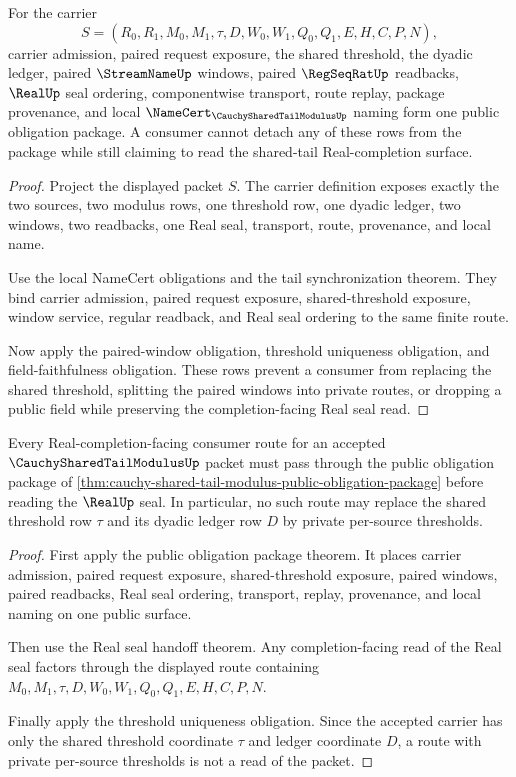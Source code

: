 \begin{theorem}
\label{thm:cauchy-shared-tail-modulus-public-obligation-package}
For the carrier
$$
S=(R_0,R_1,M_0,M_1,\tau,D,W_0,W_1,Q_0,Q_1,E,H,C,P,N),
$$
carrier admission, paired request exposure, the shared threshold, the dyadic ledger, paired $\StreamNameUp$ windows, paired $\RegSeqRatUp$ readbacks, $\RealUp$ seal ordering, componentwise transport, route replay, package provenance, and local $\NameCert_{\CauchySharedTailModulusUp}$ naming form one public obligation package. A consumer cannot detach any of these rows from the package while still claiming to read the shared-tail Real-completion surface.
\end{theorem}
\begin{proof}
Project the displayed packet $S$. The carrier definition exposes exactly the two sources, two modulus rows, one threshold row, one dyadic ledger, two windows, two readbacks, one Real seal, transport, route, provenance, and local name.

Use the local NameCert obligations and the tail synchronization theorem. They bind carrier admission, paired request exposure, shared-threshold exposure, window service, regular readback, and Real seal ordering to the same finite route.

Now apply the paired-window obligation, threshold uniqueness obligation, and field-faithfulness obligation. These rows prevent a consumer from replacing the shared threshold, splitting the paired windows into private routes, or dropping a public field while preserving the completion-facing Real seal read.
\end{proof}

\begin{theorem}
\label{thm:cauchy-shared-tail-modulus-real-completion-obligation-closure}
Every Real-completion-facing consumer route for an accepted $\CauchySharedTailModulusUp$ packet must pass through the public obligation package of \autoref{thm:cauchy-shared-tail-modulus-public-obligation-package} before reading the $\RealUp$ seal. In particular, no such route may replace the shared threshold row $\tau$ and its dyadic ledger row $D$ by private per-source thresholds.
\end{theorem}
\begin{proof}
First apply the public obligation package theorem. It places carrier admission, paired request exposure, shared-threshold exposure, paired windows, paired readbacks, Real seal ordering, transport, replay, provenance, and local naming on one public surface.

Then use the Real seal handoff theorem. Any completion-facing read of the Real seal factors through the displayed route containing $M_0,M_1,\tau,D,W_0,W_1,Q_0,Q_1,E,H,C,P,N$.

Finally apply the threshold uniqueness obligation. Since the accepted carrier has only the shared threshold coordinate $\tau$ and ledger coordinate $D$, a route with private per-source thresholds is not a read of the packet.
\end{proof}

